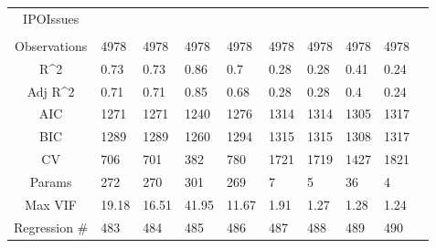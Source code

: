 \documentclass{article}
\begin{document}
\begin{table}[H]
\begin{tabular}{|clllllllll|}
  IPOIssues &  &  &  &  &  &  &  &  & \\ 
   &  &  &  &  &  &  &  &  & \\ 
  \hline 
 Observations & 4978 & 4978 & 4978 & 4978 & 4978 & 4978 & 4978 & 4978 & \\ 
  R^2 & 0.73 & 0.73 & 0.86 & 0.7 & 0.28 & 0.28 & 0.41 & 0.24 & \\ 
  Adj R^2 & 0.71 & 0.71 & 0.85 & 0.68 & 0.28 & 0.28 & 0.4 & 0.24 & \\ 
  AIC & 1271 & 1271 & 1240 & 1276 & 1314 & 1314 & 1305 & 1317 & \\ 
  BIC & 1289 & 1289 & 1260 & 1294 & 1315 & 1315 & 1308 & 1317 & \\ 
  CV & 706 & 701 & 382 & 780 & 1721 & 1719 & 1427 & 1821 & \\ 
  Params & 272 & 270 & 301 & 269 & 7 & 5 & 36 & 4 & \\ 
  Max VIF & 19.18 & 16.51 & 41.95 & 11.67 & 1.91 & 1.27 & 1.28 & 1.24 & \\ 
  Regression \# & 483 & 484 & 485 & 486 & 487 & 488 & 489 & 490 & \\ 
   \hline
\end{tabular}
 
\end{table}
\end{document}
